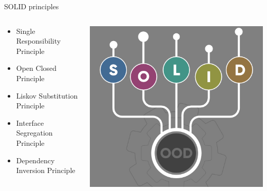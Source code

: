 \documentclass[13pt]{beamer}
\begin{document}
\begin{frame}{SOLID principles}
\begin{columns}[T]
\begin{column}{.5\textwidth}                                               
	\begin{itemize}
		\setlength\itemsep{2em}
		\item Single Responsibility Principle \\ 
		\item Open Closed Principle \\
		\item Liskov Substitution Principle \\
		\item Interface Segregation Principle \\
		\item Dependency Inversion Principle
	\end{itemize}                                
\end{column}

\begin{column}{.5\textwidth}
	\begin{center}
	\includegraphics[scale=1.3]{solid.png}
	\end{center}
\end{column}%
\end{columns}
\end{frame}
\end{document}
